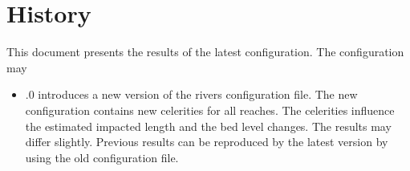 \section{History}

This document presents the results of the latest configuration.
The configuration may

\begin{itemize}
\item {}.0 introduces a new version of the  rivers configuration file.
The new configuration contains new celerities for all reaches.
The celerities influence the estimated impacted length and the bed level changes.
The results may differ slightly.
Previous results can be reproduced by the latest \dfmi version by using the old configuration file.
\end{itemize}